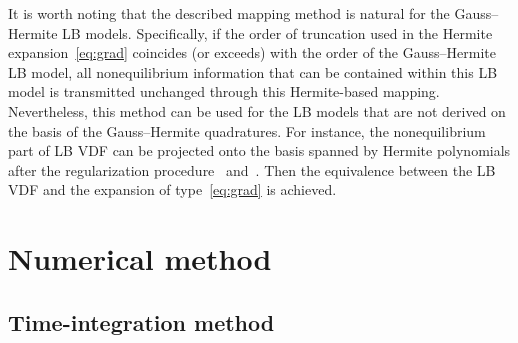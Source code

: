 \documentclass{elsarticle} %
\newcommand{\bxi}{\boldsymbol{\xi}}
\newcommand{\bc}{\boldsymbol{c}}
\newcommand{\be}{\boldsymbol{e}}
\newcommand{\LB}{\mathrm{LB}}
\newcommand{\Aa}{a_{\alpha}}
\newcommand{\Aab}{a_{\alpha\beta}}
\newcommand{\Aabg}{a_{\alpha\beta\gamma}}
\newcommand{\Ha}{H_{\alpha}}
\newcommand{\Hab}{H_{\alpha\beta}}
\newcommand{\Habg}{H_{\alpha\beta\gamma}}
\begin{document}
%

It is worth noting that the described mapping method is natural for the Gauss--Hermite LB models.
Specifically, if the order of truncation used in the Hermite expansion~\eqref{eq:grad}
coincides (or exceeds) with the order of the Gauss--Hermite LB model,
all nonequilibrium information that can be contained within this LB model
is transmitted unchanged through this Hermite-based mapping.
Nevertheless, this method can be used for the LB models
that are not derived on the basis of the Gauss--Hermite quadratures.
For instance, the nonequilibrium part of LB VDF can be projected onto the basis
spanned by Hermite polynomials after the regularization procedure~\cite{Latt2006, Chen2006}
and~\cite{Zhang2006, Mont2015, Mattila2017}.
Then the equivalence between the LB VDF and the expansion of type~\eqref{eq:grad} is achieved.

\section{Numerical method}\label{sec:numerics}

\subsection{Time-integration method}\label{sec:numerics:splitting}
\end{document}
